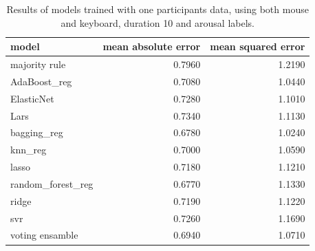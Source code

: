 \begin{table}[!h]
    \centering
    \begin{tabular}{lrr}
        \toprule
                     model &  mean absolute error &  mean squared error \\
        \midrule
             majority rule &               0.7960 &              1.2190 \\
              AdaBoost\_reg &               0.7080 &              1.0440 \\
                ElasticNet &               0.7280 &              1.1010 \\
                      Lars &               0.7340 &              1.1130 \\
               bagging\_reg &               0.6780 &              1.0240 \\
                   knn\_reg &               0.7000 &              1.0590 \\
                     lasso &               0.7180 &              1.1210 \\
         random\_forest\_reg &               0.6770 &              1.1330 \\
                     ridge &               0.7190 &              1.1220 \\
                       svr &               0.7260 &              1.1690 \\
           voting ensamble &               0.6940 &              1.0710 \\
        \bottomrule
    \end{tabular}   
    \caption{Results of models trained with one participants data, using both mouse and keyboard, duration 10 and arousal labels.}     
\end{table}

